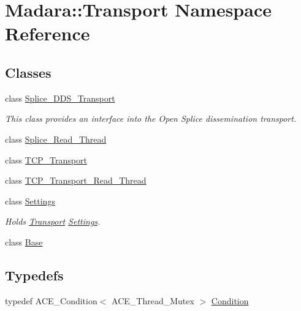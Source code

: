 \hypertarget{namespaceMadara_1_1Transport}{
\section{Madara::Transport Namespace Reference}
\label{dd/deb/namespaceMadara_1_1Transport}
}
\subsection*{Classes}
\begin{DoxyCompactItemize}
\item 
class \hyperlink{classMadara_1_1Transport_1_1Splice__DDS__Transport}{Splice\_\-DDS\_\-Transport}
\begin{DoxyCompactList}\small\item\em This class provides an interface into the Open Splice dissemination transport. \item\end{DoxyCompactList}\item 
class \hyperlink{classMadara_1_1Transport_1_1Splice__Read__Thread}{Splice\_\-Read\_\-Thread}
\item 
class \hyperlink{classMadara_1_1Transport_1_1TCP__Transport}{TCP\_\-Transport}
\item 
class \hyperlink{classMadara_1_1Transport_1_1TCP__Transport__Read__Thread}{TCP\_\-Transport\_\-Read\_\-Thread}
\item 
class \hyperlink{classMadara_1_1Transport_1_1Settings}{Settings}
\begin{DoxyCompactList}\small\item\em Holds \hyperlink{namespaceMadara_1_1Transport}{Transport} \hyperlink{classMadara_1_1Transport_1_1Settings}{Settings}. \item\end{DoxyCompactList}\item 
class \hyperlink{classMadara_1_1Transport_1_1Base}{Base}
\end{DoxyCompactItemize}
\subsection*{Typedefs}
\begin{DoxyCompactItemize}
\item 
typedef ACE\_\-Condition$<$ ACE\_\-Thread\_\-Mutex $>$ \hyperlink{namespaceMadara_1_1Transport_a5dd6d9a7fb47cdbf2d1448242da4e13d}{Condition}
\end{DoxyCompactItemize}
